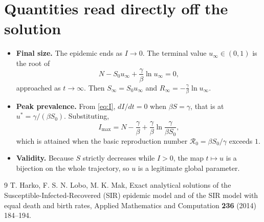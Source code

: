 \documentclass[11pt]{article}
\begin{document}
\section{Quantities read directly off the solution}
\begin{itemize}
  \item \textbf{Final size.} The epidemic ends as $I \to 0$. The terminal value
    $u_\infty \in (0, 1)$ is the root of
    \[
    N - S_0 u_\infty + \frac{\gamma}{\beta} \ln u_\infty = 0,
    \]
    approached as $t \to \infty$. Then $S_\infty = S_0 u_\infty$ and
    $R_\infty = -\frac{\gamma}{\beta} \ln u_\infty$.
  \item \textbf{Peak prevalence.} From \eqref{eq:I}, $dI/dt = 0$ when
    $\beta S = \gamma$, that is at $u^\ast = \gamma / (\beta S_0)$. Substituting,
    \[
    I_{\max} = N - \frac{\gamma}{\beta}
      + \frac{\gamma}{\beta} \ln\frac{\gamma}{\beta S_0},
    \]
    which is attained when the basic reproduction number
    $\mathcal{R}_0 = \beta S_0 / \gamma$ exceeds $1$.
  \item \textbf{Validity.} Because $S$ strictly decreases while $I > 0$, the map
    $t \mapsto u$ is a bijection on the whole trajectory, so $u$ is a legitimate
    global parameter.
\end{itemize}

\begin{thebibliography}{9}
T. Harko, F. S. N. Lobo, M. K. Mak,
Exact analytical solutions of the Susceptible-Infected-Recovered (SIR) epidemic
model and of the SIR model with equal death and birth rates,
Applied Mathematics and Computation \textbf{236} (2014) 184--194.
\end{thebibliography}
\end{document}

